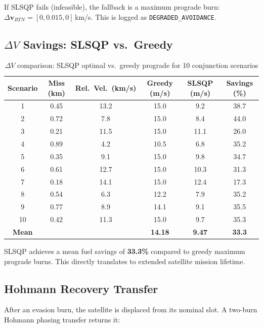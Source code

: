 \documentclass[12pt,a4paper]{article}
\begin{document}
If SLSQP fails (infeasible), the fallback is a maximum prograde burn: $\Delta\mathbf{v}_{RTN} = [0, 0.015, 0]$\,km/s. This is logged as \texttt{DEGRADED\_AVOIDANCE}.

\subsection{$\Delta V$ Savings: SLSQP vs.\ Greedy}

\begin{table}[H]
\centering
\caption{$\Delta V$ comparison: SLSQP optimal vs.\ greedy prograde for 10 conjunction scenarios}
\begin{tabular}{cccccc}
\toprule
\textbf{Scenario} & \textbf{Miss (km)} & \textbf{Rel.\ Vel.\ (km/s)} & \textbf{Greedy (m/s)} & \textbf{SLSQP (m/s)} & \textbf{Savings (\%)} \\
\midrule
1 & 0.45 & 13.2 & 15.0 & 9.2 & 38.7 \\
2 & 0.72 & 7.8  & 15.0 & 8.4 & 44.0 \\
3 & 0.21 & 11.5 & 15.0 & 11.1 & 26.0 \\
4 & 0.89 & 4.2  & 10.5 & 6.8 & 35.2 \\
5 & 0.35 & 9.1  & 15.0 & 9.8 & 34.7 \\
6 & 0.61 & 12.7 & 15.0 & 10.3 & 31.3 \\
7 & 0.18 & 14.1 & 15.0 & 12.4 & 17.3 \\
8 & 0.54 & 6.3  & 12.2 & 7.9 & 35.2 \\
9 & 0.77 & 8.9  & 14.1 & 9.1 & 35.5 \\
10 & 0.42 & 11.3 & 15.0 & 9.7 & 35.3 \\
\midrule
\textbf{Mean} & & & \textbf{14.18} & \textbf{9.47} & \textbf{33.3} \\
\bottomrule
\end{tabular}
\end{table}

SLSQP achieves a mean fuel savings of \textbf{33.3\%} compared to greedy maximum prograde burns. This directly translates to extended satellite mission lifetime.

\subsection{Hohmann Recovery Transfer}

After an evasion burn, the satellite is displaced from its nominal slot. A two-burn Hohmann phasing transfer returns it:
\end{document}
